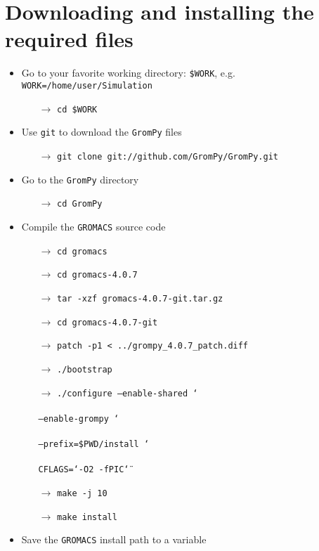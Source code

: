 \documentclass[fleqn,a4paper,12pt]{article}
\begin{document}
\section{Downloading and installing the required files}
\begin{itemize}
	\item Go to your favorite working directory: {\tt \$WORK}, e.g. {\tt 
	WORK=/home/user/Simulation}
	\begin{itemize}
		\item[$\to$] {\tt cd \$WORK}
    \end{itemize}
	\item Use {\tt git} to download the {\tt GromPy} files
	\begin{itemize}
		\item[$\to$] {\tt git clone git://github.com/GromPy/GromPy.git}
	\end{itemize}
	\item Go to the {\tt GromPy} directory
	\begin{itemize}
		\item[$\to$] {\tt cd GromPy}
	\end{itemize}
	\item Compile the {\tt GROMACS} source code
	\begin{itemize}
		\item[$\to$] {\tt cd gromacs}
		\item[$\to$] {\tt cd gromacs-4.0.7}
		\item[$\to$] {\tt tar -xzf gromacs-4.0.7-git.tar.gz} 
		\item[$\to$] {\tt cd gromacs-4.0.7-git}
		\item[$\to$] {\tt patch -p1 < ../grompy\_4.0.7\_patch.diff}
		\item[$\to$] {\tt ./bootstrap} 
		\item[$\to$] {\tt ./configure --enable-shared \char`\\ }\\
					   {\tt --enable-grompy \char`\\} \\
				       {\tt --prefix=\$PWD/install \char`\\}\\
				       {\tt CFLAGS=\char`\"-O2 -fPIC\char`\"}
		\item[$\to$] {\tt make -j 10}
		\item[$\to$] {\tt make install}
	\end{itemize}
	\item Save the {\tt GROMACS} install path to a variable

\end{itemize}
\end{document}
